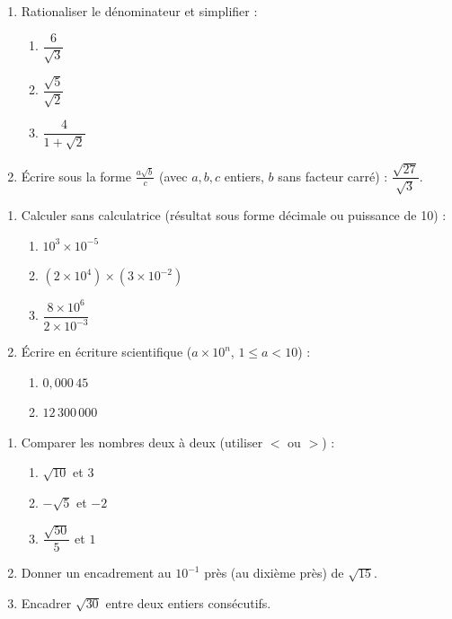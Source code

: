 \documentclass[11pt]{article}
\begin{document}
\begin{exercice}
\begin{enumerate}
    \item Rationaliser le dénominateur et simplifier :
    \begin{enumerate}
        \item $\dfrac{6}{\sqrt{3}}$
        \item $\dfrac{\sqrt{5}}{\sqrt{2}}$
        \item $\dfrac{4}{1+\sqrt{2}}$
    \end{enumerate}
    \item Écrire sous la forme $\frac{a\sqrt{b}}{c}$ (avec $a,b,c$ entiers, $b$ sans facteur carré) :
    $\dfrac{\sqrt{27}}{\sqrt{3}}$.
\end{enumerate}
\end{exercice}

\begin{exercice}
\begin{enumerate}
    \item Calculer sans calculatrice (résultat sous forme décimale ou puissance de 10) :
    \begin{enumerate}
        \item $10^3 \times 10^{-5}$
        \item $(2 \times 10^4) \times (3 \times 10^{-2})$
        \item $\dfrac{8 \times 10^6}{2 \times 10^{-3}}$
    \end{enumerate}
    \item Écrire en écriture scientifique ($a \times 10^n$, $1 \leqslant a < 10$) :
    \begin{enumerate}
        \item $0,000\,45$
        \item $12\,300\,000$
    \end{enumerate}
\end{enumerate}
\end{exercice}

\begin{exercice}
\begin{enumerate}
    \item Comparer les nombres deux à deux (utiliser $<$ ou $>$) :
    \begin{enumerate}
        \item $\sqrt{10}$ et $3$
        \item $-\sqrt{5}$ et $-2$
        \item $\dfrac{\sqrt{50}}{5}$ et $1$
    \end{enumerate}
    \item Donner un encadrement au $10^{-1}$ près (au dixième près) de $\sqrt{15}$.
    \item Encadrer $\sqrt{30}$ entre deux entiers consécutifs.
\end{enumerate}
\end{exercice}
\end{document}
